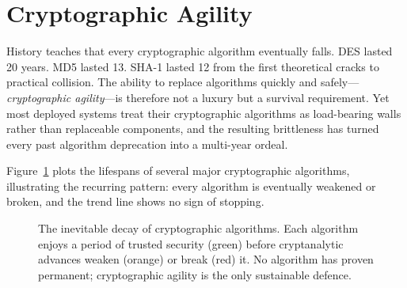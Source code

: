 \section{Cryptographic Agility}
\label{sec:crypto-agility}

History teaches that every cryptographic algorithm eventually falls.  DES lasted 20 years.  MD5 lasted 13.  SHA-1 lasted 12 from the first theoretical cracks to practical collision.  The ability to replace algorithms quickly and safely---\emph{cryptographic agility}---is therefore not a luxury but a survival requirement.  Yet most deployed systems treat their cryptographic algorithms as load-bearing walls rather than replaceable components, and the resulting brittleness has turned every past algorithm deprecation into a multi-year ordeal.

Figure~\ref{fig:ch17-algorithm-decay} plots the lifespans of several major cryptographic algorithms, illustrating the recurring pattern: every algorithm is eventually weakened or broken, and the trend line shows no sign of stopping.

\begin{figure}[t]
\centering
{}
\caption{The inevitable decay of cryptographic algorithms.  Each algorithm enjoys a period of trusted security (green) before cryptanalytic advances weaken (orange) or break (red) it.  No algorithm has proven permanent; cryptographic agility is the only sustainable defence.}
\label{fig:ch17-algorithm-decay}
\end{figure}

